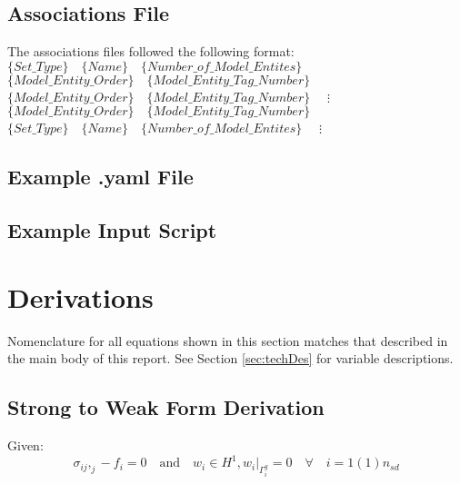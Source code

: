 \documentclass[a4paper, 12pt]{article}
\begin{document}
\subsection{Associations File} \label{subsec:ExAssoc}
The associations files followed the following format:
\newline
$\{Set\_Type\} \quad  \{Name\} \quad  \{Number\_of\_Model\_Entites\} \quad $ 
\newline
$\{Model\_Entity\_Order\} \quad  \{Model\_Entity\_Tag\_Number\} \quad $
\newline
$\{Model\_Entity\_Order\} \quad  \{Model\_Entity\_Tag\_Number\} \quad $
\newline
$\vdots$
\newline
$\{Model\_Entity\_Order\} \quad  \{Model\_Entity\_Tag\_Number\} \quad $
\newline
$\{Set\_Type\} \quad  \{Name\} \quad  \{Number\_of\_Model\_Entites\} \quad $ 
\newline
$\vdots$
\newline


\newpage
\subsection{Example .yaml File} \label{subsec:ExYaml}


\newpage
\subsection{Example Input Script} \label{subsec:ExIn}


\newpage
\section{Derivations} \label{sec:Derivations}

Nomenclature for all equations shown in this section 
matches that described in the main body of this report. 
See Section \ref{sec:techDes} for variable descriptions.

\subsection{Strong to Weak Form Derivation} \label{sec:WeakDer}

Given:
\begin{equation*}
\sigma_{ij},_{j} - f_{i} = 0 \quad \text{and} \quad
w_{i} \in H^1, w_{i}\Big|_{\Gamma^{g}_{i}} = 0
    \quad \forall \quad i=1(1)n_{sd}
\end{equation*}
\end{document}
